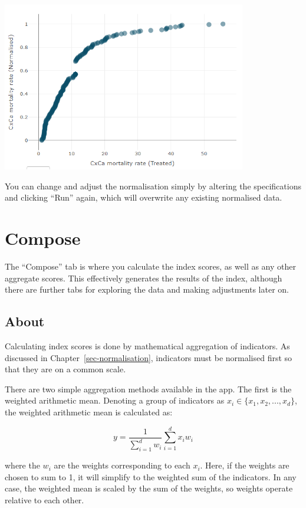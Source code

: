 \documentclass[
  letterpaper,
  DIV=11,
  numbers=noendperiod]{scrreprt}
\begin{document}
\includegraphics[width=0.8\textwidth,height=\textheight]{figs/normalisation_2.png}

You can change and adjust the normalisation simply by altering the
specifications and clicking ``Run'' again, which will overwrite any
existing normalised data.

\hypertarget{sec-compose}{%
\chapter{Compose}\label{sec-compose}}

The ``Compose'' tab is where you calculate the index scores, as well as
any other aggregate scores. This effectively generates the results of
the index, although there are further tabs for exploring the data and
making adjustments later on.

\hypertarget{about-4}{%
\section{About}\label{about-4}}

Calculating index scores is done by mathematical aggregation of
indicators. As discussed in Chapter~\ref{sec-normalisation}, indicators
must be normalised first so that they are on a common scale.

There are two simple aggregation methods available in the app. The first
is the weighted arithmetic mean. Denoting a group of indicators as
\(x_i \in \{x_1, x_2, ... , x_d \}\), the weighted arithmetic mean is
calculated as:

\[ y = \frac{1}{\sum_{i=1}^d w_i} \sum_{i=1}^d x_iw_i \]

where the \(w_i\) are the weights corresponding to each \(x_i\). Here,
if the weights are chosen to sum to 1, it will simplify to the weighted
sum of the indicators. In any case, the weighted mean is scaled by the
sum of the weights, so weights operate relative to each other.
\end{document}
